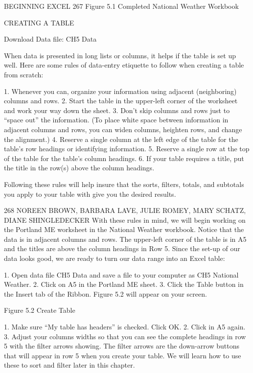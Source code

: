 BEGINNING EXCEL 267
Figure 5.1 Completed National Weather Workbook


CREATING A TABLE

Download Data file: CH5 Data

When data is presented in long lists or columns, it helps if the table is set up well. Here are some rules
of data-entry etiquette to follow when creating a table from scratch:

1. Whenever you can, organize your information using adjacent (neighboring) columns and rows.
2. Start the table in the upper-left corner of the worksheet and work your way down the sheet.
3. Don’t skip columns and rows just to “space out” the information. (To place white space between
information in adjacent columns and rows, you can widen columns, heighten rows, and change
the alignment.)
4. Reserve a single column at the left edge of the table for the table’s row headings or identifying
information.
5. Reserve a single row at the top of the table for the table’s column headings.
6. If your table requires a title, put the title in the row(s) above the column headings.

Following these rules will help insure that the sorts, filters, totals, and subtotals you apply to your
table with give you the desired results.


268 NOREEN BROWN, BARBARA LAVE, JULIE ROMEY, MARY SCHATZ, DIANE SHINGLEDECKER
With these rules in mind, we will begin working on the Portland ME worksheet in the National
Weather workbook. Notice that the data is in adjacent columns and rows. The upper-left corner of
the table is in A5 and the titles are above the column headings in Row 5. Since the set-up of our data
looks good, we are ready to turn our data range into an Excel table:

1. Open data file CH5 Data and save a file to your computer as CH5 National Weather.
2. Click on A5 in the Portland ME sheet.
3. Click the Table button in the Insert tab of the Ribbon.
Figure 5.2 will appear on your screen.




Figure 5.2 Create Table


1. Make sure “My table has headers” is checked. Click OK.
2. Click in A5 again.
3. Adjust your columns widths so that you can see the complete headings in row 5 with the filter
arrows showing. The filter arrows are the down-arrow buttons that will appear in row 5 when
you create your table. We will learn how to use these to sort and filter later in this chapter.

